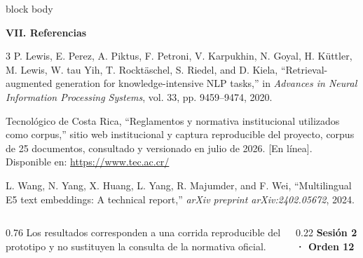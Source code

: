 \documentclass[final]{beamer}
\begin{document}
\begin{frame}[t]
\vspace{0.55cm}

\begin{beamercolorbox}[wd=\textwidth,sep=0cm]{block body}
  {\color{Navy}\bfseries\fontsize{25}{29}\selectfont VII. Referencias\par}
  \vspace{0.25cm}
  {\fontsize{19}{23}\selectfont
    \begin{thebibliography}{3}
      \setlength{\itemsep}{0.18cm}
      P. Lewis, E. Perez, A. Piktus, F. Petroni, V. Karpukhin, N. Goyal,
      H. Küttler, M. Lewis, W. tau Yih, T. Rocktäschel, S. Riedel, and
      D. Kiela, ``Retrieval-augmented generation for knowledge-intensive NLP
      tasks,'' in \textit{Advances in Neural Information Processing Systems},
      vol. 33, pp. 9459--9474, 2020.

      Tecnológico de Costa Rica, ``Reglamentos y normativa institucional
      utilizados como corpus,'' sitio web institucional y captura reproducible
      del proyecto, corpus de 25 documentos, consultado y versionado en julio
      de 2026. [En línea]. Disponible en: \url{https://www.tec.ac.cr/}

      L. Wang, N. Yang, X. Huang, L. Yang, R. Majumder, and F. Wei,
      ``Multilingual E5 text embeddings: A technical report,''
      \textit{arXiv preprint arXiv:2402.05672}, 2024.
    \end{thebibliography}
  }
\end{beamercolorbox}

\vspace{0.45cm}
\begin{columns}[T,totalwidth=\textwidth]
  \begin{column}{0.76\textwidth}
    {\color{BodyText}\fontsize{19}{23}\selectfont
      Los resultados corresponden a una corrida reproducible del prototipo y
      no sustituyen la consulta de la normativa oficial.}
  \end{column}
  \begin{column}{0.22\textwidth}
    \raggedleft
    {\color{Navy}\bfseries\fontsize{19}{23}\selectfont Sesión 2 · Orden 12}
  \end{column}
\end{columns}

\end{frame}
\end{document}
